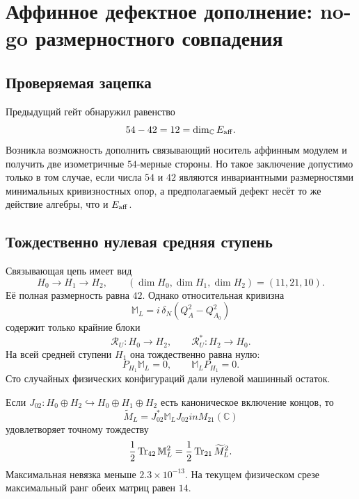 \chapter{Аффинное дефектное дополнение: no-go размерностного совпадения}
\label{ch:v7-affine-defect-bicomplex-completion-gate}

\section{Проверяемая зацепка}

Предыдущий гейт обнаружил равенство
\begin{equation}
 54-42=12=\dim_{\mathbb C}E_{\rm aff}.
 \label{eq:v7-affine-defect-apparent-match}
\end{equation}
Возникла возможность дополнить связывающий носитель аффинным модулем и
получить две изометричные $54$-мерные стороны. Но такое заключение допустимо
только в том случае, если числа $54$ и $42$ являются инвариантными
размерностями минимальных кривизностных опор, а предполагаемый дефект несёт
то же действие алгебры, что и $E_{\rm aff}$.

\section{Тождественно нулевая средняя ступень}

Связывающая цепь имеет вид
\begin{equation}
 H_0\longrightarrow H_1\longrightarrow H_2,
 \qquad
 (\dim H_0,\dim H_1,\dim H_2)=(11,21,10).
\end{equation}
Её полная размерность равна $42$. Однако относительная кривизна
\begin{equation}
 \mathbb M_L=i\,\delta_N(Q_A^2-Q_{A_0}^2)
\end{equation}
содержит только крайние блоки
\begin{equation}
 \mathcal R_U:H_0\to H_2,
 \qquad
 \mathcal R_U^*:H_2\to H_0.
\end{equation}
На всей средней ступени $H_1$ она тождественно равна нулю:
\begin{equation}
 P_{H_1}\mathbb M_L=0,
 \qquad
 \mathbb M_LP_{H_1}=0.
 \label{eq:v7-affine-defect-middle-zero}
\end{equation}
Сто случайных физических конфигураций дали нулевой машинный остаток.

Если $J_{02}:H_0\oplus H_2\hookrightarrow H_0\oplus H_1\oplus H_2$ есть
каноническое включение концов, то
\begin{equation}
 \widetilde M_L=J_{02}^*\mathbb M_LJ_{02}in M_{21}(\mathbb C)
\end{equation}
удовлетворяет точному тождеству
\begin{equation}
 \frac12\operatorname{Tr}_{42}\mathbb M_L^2
 =\frac12\operatorname{Tr}_{21}\widetilde M_L^2.
 \label{eq:v7-affine-defect-support-compression}
\end{equation}
Максимальная невязка меньше $2.3\times10^{-13}$. На текущем физическом
срезе максимальный ранг обеих матриц равен $14$.

